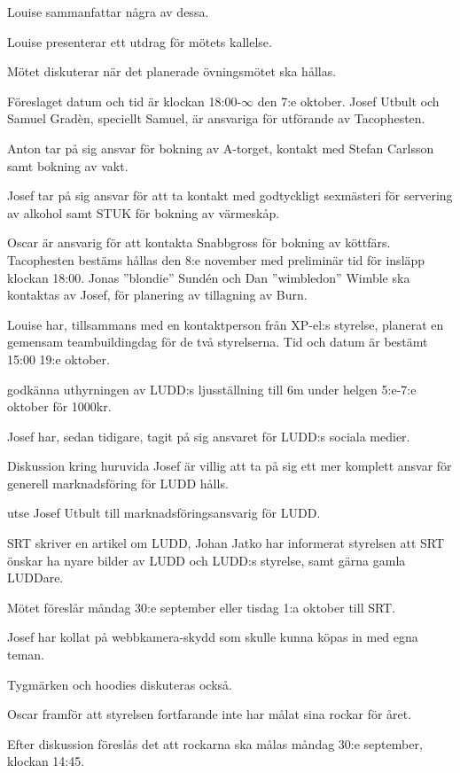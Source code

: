 \documentclass{protokoll}
\begin{document}
Louise sammanfattar några av dessa. 

Louise presenterar ett utdrag för mötets kallelse.

Mötet diskuterar när det planerade övningsmötet ska hållas.


Föreslaget datum och tid är klockan 18:00-$\infty$ den 7:e oktober.
Josef Utbult och Samuel Gradèn, speciellt Samuel, är ansvariga för utförande av 
Tacophesten. 

Anton tar på sig ansvar för bokning av A-torget, kontakt med Stefan Carlsson 
samt bokning av vakt.

Josef tar på sig ansvar för att ta kontakt med godtyckligt sexmästeri för 
servering av alkohol samt STUK för bokning av värmeskåp.

Oscar är ansvarig för att kontakta Snabbgross för bokning av köttfärs.
Tacophesten bestäms hållas den 8:e november med preliminär tid för insläpp
klockan 18:00.
Jonas ''blondie'' Sundén och Dan ''wimbledon'' Wimble ska kontaktas av Josef,
för planering av tillagning av Burn. 

Louise har, tillsammans med en kontaktperson från XP-el:s styrelse, planerat en
gemensam teambuildingdag för de två styrelserna. Tid och datum är bestämt 15:00
19:e oktober. 

\begin{beslut}
  \att godkänna uthyrningen av LUDD:s ljusställning till 6m under helgen
  5:e-7:e oktober för 1000kr.
\end{beslut}

Josef har, sedan tidigare, tagit på sig ansvaret för LUDD:s sociala medier.  

Diskussion kring huruvida Josef är villig att ta på sig ett mer komplett
ansvar för generell marknadsföring för LUDD hålls.
\begin{beslut}
  \att utse Josef Utbult till marknadsföringsansvarig för LUDD.
\end{beslut}

SRT skriver en artikel om LUDD, Johan Jatko har informerat styrelsen att SRT
önskar ha nyare bilder av LUDD och LUDD:s styrelse, samt gärna gamla LUDDare. 

Mötet föreslår måndag 30:e september eller tisdag 1:a oktober till SRT.

Josef har kollat på webbkamera-skydd som skulle kunna köpas in med egna teman. 


Tygmärken och hoodies diskuteras också. 

Oscar framför att styrelsen fortfarande inte har målat sina rockar för året. 


Efter diskussion föreslås det att rockarna ska målas måndag 30:e september, 
klockan 14:45.
\end{document}
